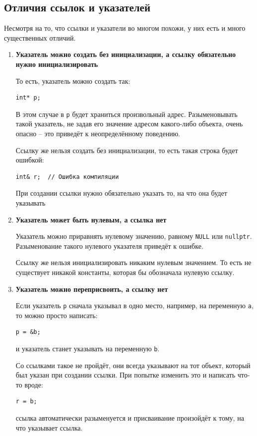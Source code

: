 \documentclass{article}
\begin{document}
\subsection*{Отличия ссылок и указателей}
Несмотря на то, что ссылки и указатели во многом похожи, у них есть и много существенных отличий.
\begin{enumerate}
\item \textbf{Указатель можно создать без инициализации, а ссылку обязательно нужно инициализировать}

То есть, указатель можно создать так:
\begin{lstlisting}
int* p;
\end{lstlisting}
В этом случае в \texttt{p} будет храниться произвольный адрес. Разыменовывать такой указатель, не задав его значение адресом какого-либо объекта, очень опасно -- это приведёт к неопределённому поведению.

Ссылку же нельзя создать без инициализации, то есть такая строка будет ошибкой:
\begin{lstlisting}
int& r;  // Ошибка компиляции
\end{lstlisting}
При создании ссылки нужно обязательно указать то, на что она будет указывать


\item \textbf{Указатель может быть нулевым, а ссылка нет}

Указатель можно приравнять нулевому значению, равному \texttt{NULL} или \texttt{nullptr}. Разыменование такого нулевого указателя приведёт к ошибке.

Ссылку же нельзя инициализировать никаким нулевым значением.
То есть не существует никакой константы, которая бы обозначала нулевую ссылку.

\item\textbf{ Указатель можно переприсвоить, а ссылку нет}

Если указатель \texttt{p} сначала указывал в одно место, например, на переменную \texttt{a}, то можно просто написать:
\begin{lstlisting}
p = &b;
\end{lstlisting}
и указатель станет указывать на переменную \texttt{b}.

Со ссылками такое не пройдёт, они всегда указывают на тот объект, который был указан при создании ссылки.
При попытке изменить это и написать что-то вроде:
\begin{lstlisting}
r = b;
\end{lstlisting}
ссылка автоматически разыменуется и присваивание произойдёт к тому, на что указывает ссылка.


\end{enumerate}
\end{document}

